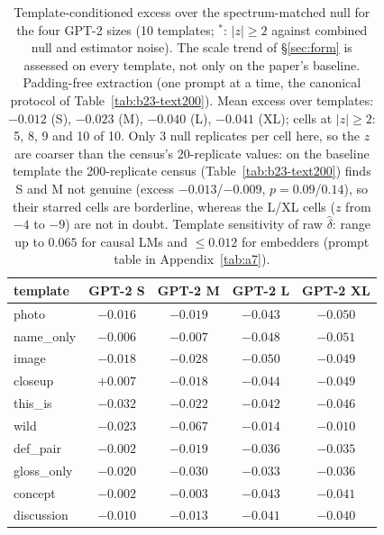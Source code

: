 \begin{table}[H]
\centering
\small
\setlength{\tabcolsep}{4pt}
\begin{tabular}{lcccc}
\toprule
template & GPT-2 S & GPT-2 M & GPT-2 L & GPT-2 XL \\
\midrule
photo & $-0.016$\rlap{$^*$} & $-0.019$\rlap{$^*$} & $-0.043$\rlap{$^*$} & $-0.050$\rlap{$^*$} \\
name\_only & $-0.006$ & $-0.007$ & $-0.048$\rlap{$^*$} & $-0.051$\rlap{$^*$} \\
image & $-0.018$\rlap{$^*$} & $-0.028$\rlap{$^*$} & $-0.050$\rlap{$^*$} & $-0.049$\rlap{$^*$} \\
closeup & $+0.007$ & $-0.018$\rlap{$^*$} & $-0.044$\rlap{$^*$} & $-0.049$\rlap{$^*$} \\
this\_is & $-0.032$\rlap{$^*$} & $-0.022$\rlap{$^*$} & $-0.042$\rlap{$^*$} & $-0.046$\rlap{$^*$} \\
wild & $-0.023$\rlap{$^*$} & $-0.067$\rlap{$^*$} & $-0.014$ & $-0.010$\rlap{$^*$} \\
def\_pair & $-0.002$ & $-0.019$\rlap{$^*$} & $-0.036$\rlap{$^*$} & $-0.035$\rlap{$^*$} \\
gloss\_only & $-0.020$\rlap{$^*$} & $-0.030$\rlap{$^*$} & $-0.033$\rlap{$^*$} & $-0.036$\rlap{$^*$} \\
concept & $-0.002$ & $-0.003$ & $-0.043$\rlap{$^*$} & $-0.041$\rlap{$^*$} \\
discussion & $-0.010$ & $-0.013$\rlap{$^*$} & $-0.041$\rlap{$^*$} & $-0.040$\rlap{$^*$} \\
\bottomrule
\end{tabular}
\caption{Template-conditioned excess over the spectrum-matched null for the four GPT-2 sizes (10 templates; $^*$: $|z|\ge2$ against combined null and estimator noise). The scale trend of \S\ref{sec:form} is assessed on every template, not only on the paper's baseline. Padding-free extraction (one prompt at a time, the canonical protocol of Table~\ref{tab:b23-text200}). Mean excess over templates: $-0.012$ (S), $-0.023$ (M), $-0.040$ (L), $-0.041$ (XL); cells at $|z|\ge2$: 5, 8, 9 and 10 of 10. Only 3 null replicates per cell here, so the $z$ are coarser than the census's 20-replicate values: on the baseline template the 200-replicate census (Table~\ref{tab:b23-text200}) finds S and M not genuine (excess $-0.013$/$-0.009$, $p=0.09$/$0.14$), so their starred cells are borderline, whereas the L/XL cells ($z$ from $-4$ to $-9$) are not in doubt. Template sensitivity of raw $\hat\delta$: range up to $0.065$ for causal LMs and $\le0.012$ for embedders (prompt table in Appendix~\ref{tab:a7}).}
\label{tab:b14-templates}
\end{table}

